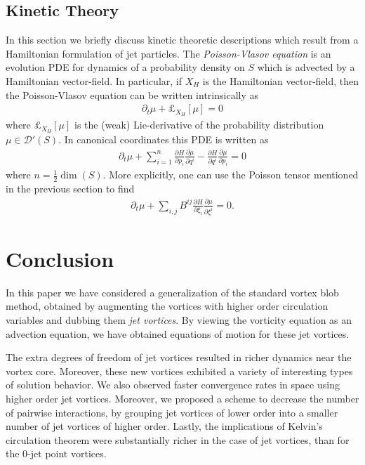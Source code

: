 \documentclass[12pt]{amsart}
\newcommand{\pder}[2]{\ensuremath{\frac{ \partial #1}{\partial #2}}}
\theoremstyle{remark}
\begin{document}
\subsection{Kinetic Theory}
\label{sec:Kinetic Theory}
In this section we briefly discuss kinetic theoretic descriptions which result from a Hamiltonian formulation of jet particles.
The \emph{Poisson-Vlasov equation} is an evolution PDE for dynamics of a probability density on $S$
which is advected by a Hamiltonian vector-field.  In particular, if $X_H$ is the Hamiltonian vector-field,
then the Poisson-Vlasov equation can be written intrinsically as
\begin{align*}
	\partial_t \mu + \pounds_{X_H}[ \mu] = 0
\end{align*}
where $\pounds_{X_H}[\mu]$ is the (weak) Lie-derivative of the probability distribution $\mu \in \mathcal{D}'(S)$.
In canonical coordinates this PDE is written as
\begin{align*}
	\partial_t \mu + \sum_{i=1}^{n} \pder{H}{p_i} \pder{\mu}{q^i} - \pder{H}{q^i} \pder{\mu}{p_i} = 0
\end{align*}
where $n = \frac{1}{2} \dim(S)$.
More explicitly, one can use the Poisson tensor mentioned in the previous section to find
\begin{align*}
	\partial_t \mu + \sum_{i,j} B^{ij} \pder{H}{\xi_i} \pder{\mu}{\xi^i} = 0.
\end{align*}

\section{Conclusion}
\label{sec:Conclusion}
In this paper we have considered a generalization of the standard vortex blob method, obtained 
by augmenting the vortices with higher order circulation variables
and dubbing them \emph{jet vortices}.
By viewing the vorticity equation as an advection equation, we have obtained equations of motion for these jet vortices.

The extra degrees of freedom of jet vortices resulted in richer dynamics near the vortex core.
Moreover, these new vortices exhibited a variety of interesting types of solution behavior.
We also observed faster convergence rates in space using higher order jet vortices.
Moreover, we proposed a scheme to decrease the number of pairwise interactions, by grouping
jet vortices of lower order into a smaller number of jet vortices of higher order.
Lastly, the implications of Kelvin's circulation theorem were substantially richer in the case of jet vortices, than for the 0-jet point vortices.
\end{document}
